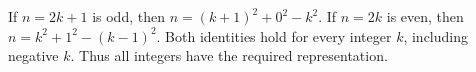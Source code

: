If $n=2k+1$ is odd, then $n=(k+1)^2+0^2-k^2$. If $n=2k$ is even, then $n=k^2+1^2-(k-1)^2$. Both identities hold for every integer $k$, including negative $k$. Thus all integers have the required representation.

